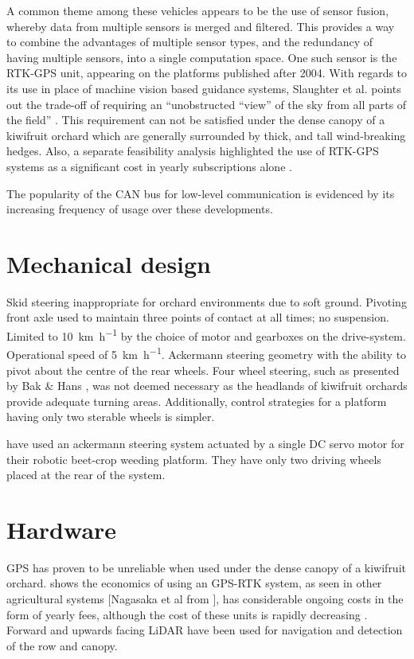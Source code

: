 \documentclass[preprint,authoryear,12pt]{elsarticle}
\begin{document}
    A common theme among these vehicles appears to be the use of sensor fusion, whereby data from multiple sensors is merged and filtered.
    This provides a way to combine the advantages of multiple sensor types, and the redundancy of having multiple sensors, into a single computation space.
    One such sensor is the RTK-GPS unit, appearing on the platforms published after 2004.
    With regards to its use in place of machine vision based guidance systems, Slaughter et al. points out the trade-off of requiring an ``unobstructed ``view'' of the sky from all parts of the field'' \citep{Slaughter2008}.
    This requirement can not be satisfied under the dense canopy of a kiwifruit orchard which are generally surrounded by thick, and tall wind-breaking hedges.
    Also, a separate feasibility analysis highlighted the use of RTK-GPS systems as a significant cost in yearly subscriptions alone \cite{Pedersen2006}.

    The popularity of the CAN bus for low-level communication is evidenced by its increasing frequency of usage over these developments.



\section{Mechanical design}
\label{sect:mechanical}
    Skid steering inappropriate for orchard environments due to soft ground.
    Pivoting front axle used to maintain three points of contact at all times; no suspension.
    Limited to \SI{10}{\kilo\meter\per\hour} by the choice of motor and gearboxes on the drive-system.
    Operational speed of \SI{5}{\kilo\meter\per\hour}.
    Ackermann steering geometry with the ability to pivot about the centre of the rear wheels.
    Four wheel steering, such as presented by Bak \& Hans \citep{Bak2004}, was not deemed necessary as the headlands of kiwifruit orchards provide adequate turning areas.
    Additionally, control strategies for a platform having only two sterable wheels is simpler.



    \citep{Astrand2002} have used an ackermann steering system actuated by a single DC servo motor for their robotic beet-crop weeding platform. They have only two driving wheels placed at the rear of the system.


\section{Hardware}
\label{sect:hardware}
    GPS has proven to be unreliable when used under the dense canopy of a kiwifruit orchard.
    \citep{Pedersen2006} shows the economics of using an GPS-RTK system, as seen in other agricultural systems \citep{Bak2004,Ruckelshausen2009}[Nagasaka et al from \citep{Torii2000}], has considerable ongoing costs in the form of yearly fees, although the cost of these units is rapidly decreasing \citep{Torii2000}.
    Forward and upwards facing LiDAR have been used for navigation and detection of the row and canopy.
\end{document}
